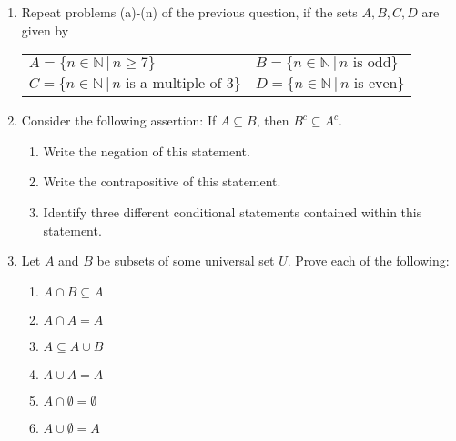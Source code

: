 \documentclass[letterpaper,12pt]{article}
\begin{document}
\begin{enumerate}
\begin{multicols}{2}
\begin{enumerate}
\item $(A\setminus D)\cup (B\setminus D)$
\item $(A\cup B)\setminus D$
\end{enumerate}
\end{multicols}
\item Repeat problems (a)-(n) of the previous question, if the sets $A,B,C,D$ are given by
\begin{center}
\begin{tabular}{ll}
$A = \{n\in\mathbb{N}\,|\, n\geq 7\}$&$B=\{n\in\mathbb{N}\,|\,n \text{ is odd}\}$\\
$C = \{n\in\mathbb{N}\,|\, n \text{ is a multiple of } 3\}$&$D = \{n\in\mathbb{N}\,|\, n \text{ is even}\}$
\end{tabular}
\end{center}
\item Consider the following assertion: If $A\subseteq B$, then $B^c\subseteq A^c$.
\begin{enumerate}
\item Write the negation of this statement.
\item Write the contrapositive of this statement.
\item Identify three different conditional statements contained within this statement.
\end{enumerate}
\item Let $A$ and $B$ be subsets of some universal set $U$. Prove each of the following:
\begin{multicols}{3}
\begin{enumerate}
\item $A\cap B\subseteq A$
\item $A\cap A=A$
\item $A\subseteq A\cup B$
\item $A\cup A=A$
\item $A\cap \emptyset = \emptyset$
\item $A\cup \emptyset = A$
\end{enumerate}
\end{multicols}
\end{enumerate}
\end{document}
